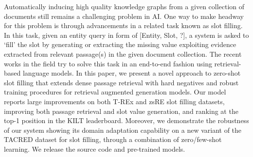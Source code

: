 Automatically inducing high quality knowledge graphs from a given collection of documents still remains a challenging problem in AI. One way to make headway for this problem is through advancements in a related task known as slot filling. In this task, given an entity query in form of [Entity, Slot, ?], a system is asked to `fill' the slot by generating or extracting the missing value exploiting evidence extracted from relevant passage(s) in the given document collection. The recent works in the field try to solve this task in an end-to-end fashion using retrieval-based language models. In this paper, we present a novel approach to zero-shot slot filling that extends dense passage retrieval with hard negatives and robust training procedures for retrieval augmented generation models.  Our model reports large improvements on both T-REx and zsRE slot filling datasets, improving both passage retrieval and slot value generation, and ranking at the top-1 position in the KILT leaderboard. Moreover, we demonstrate the robustness of our system showing its domain adaptation capability on a new variant of the TACRED dataset for slot filling, through a combination of zero/few-shot learning. We release the source code and pre-trained models.
